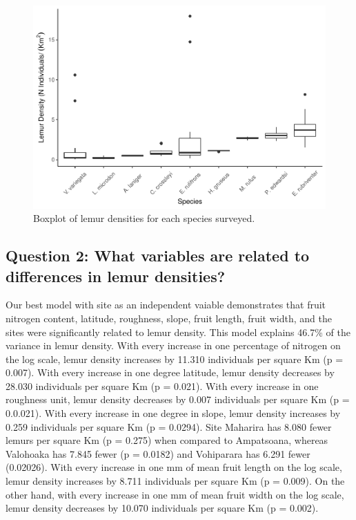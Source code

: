 \documentclass[
  12pt,
]{article}
\begin{document}
\begin{figure}
\centering
\includegraphics{project_draft_2_files/figure-latex/unnamed-chunk-10-1.pdf}
\caption{Boxplot of lemur densities for each species surveyed.}
\end{figure}

\hypertarget{question-2-what-variables-are-related-to-differences-in-lemur-densities-1}{%
\subsection{Question 2: What variables are related to differences in
lemur
densities?}\label{question-2-what-variables-are-related-to-differences-in-lemur-densities-1}}

Our best model with site as an independent vaiable demonstrates that
fruit nitrogen content, latitude, roughness, slope, fruit length, fruit
width, and the sites were significantly related to lemur density. This
model explains 46.7\% of the variance in lemur density. With every
increase in one percentage of nitrogen on the log scale, lemur density
increases by 11.310 individuals per square Km (p = 0.007). With every
increase in one degree latitude, lemur density decreases by 28.030
individuals per square Km (p = 0.021). With every increase in one
roughness unit, lemur density decreases by 0.007 individuals per square
Km (p = 0.0.021). With every increase in one degree in slope, lemur
density increases by 0.259 individuals per square Km (p = 0.0294). Site
Maharira has 8.080 fewer lemurs per square Km (p = 0.275) when compared
to Ampatsoana, whereas Valohoaka has 7.845 fewer (p = 0.0182) and
Vohiparara has 6.291 fewer (0.02026). With every increase in one mm of
mean fruit length on the log scale, lemur density increases by 8.711
individuals per square Km (p = 0.009). On the other hand, with every
increase in one mm of mean fruit width on the log scale, lemur density
decreases by 10.070 individuals per square Km (p = 0.002).
\end{document}
